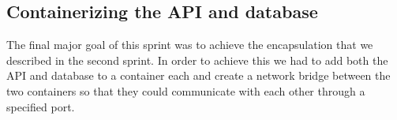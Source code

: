 \subsection{Containerizing the API and database}
The final major goal of this sprint was to achieve the encapsulation that we described in the second sprint. In order to achieve this we had to add both the API and database to a container each and create a network bridge between the two containers so that they could communicate with each other through a specified port.